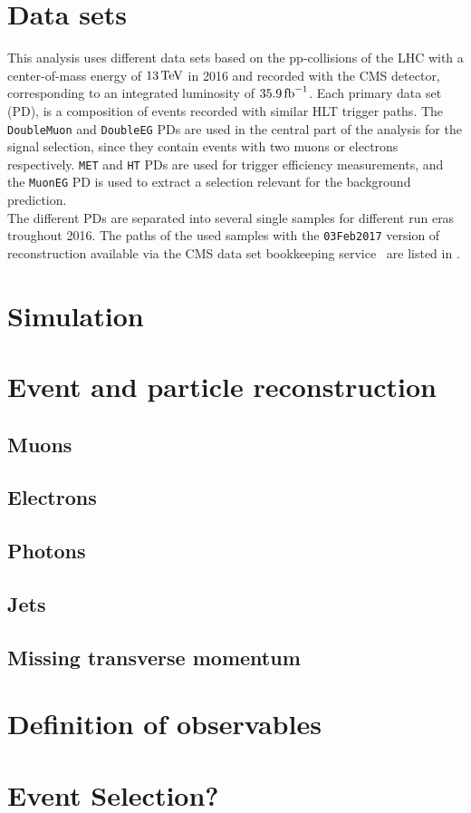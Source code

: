 \section{Data sets}
This analysis uses different data sets based on the pp-collisions of the LHC with a center-of-mass energy of $13\,\text{Te\hspace{-.08em}V}$ in 2016 and recorded with the CMS detector, corresponding to an integrated luminosity of $35.9\mbox{\ensuremath{\,\text{fb}^\text{$-$1}}}$. Each primary data set (PD), is a composition of events recorded with similar HLT trigger paths. The \texttt{DoubleMuon} and \texttt{DoubleEG} PDs are used in the central part of the analysis for the signal selection, since they contain events with two muons or electrons respectively. \texttt{MET} and \texttt{HT} PDs are used for trigger efficiency measurements, and the \texttt{MuonEG} PD is used to extract a selection relevant for the background prediction.\\
The different PDs are separated into several single samples for different run eras troughout 2016. The paths of the used samples with the \texttt{03Feb2017} version of reconstruction available via the CMS data set bookkeeping service~\cite{DASBookkeeping} are listed in .


\section{Simulation}
\section{Event and particle reconstruction}
\subsection{Muons}
\subsection{Electrons}
\subsection{Photons}
\subsection{Jets}
\subsection{Missing transverse momentum}
\section{Definition of observables}

\section{Event Selection?}
